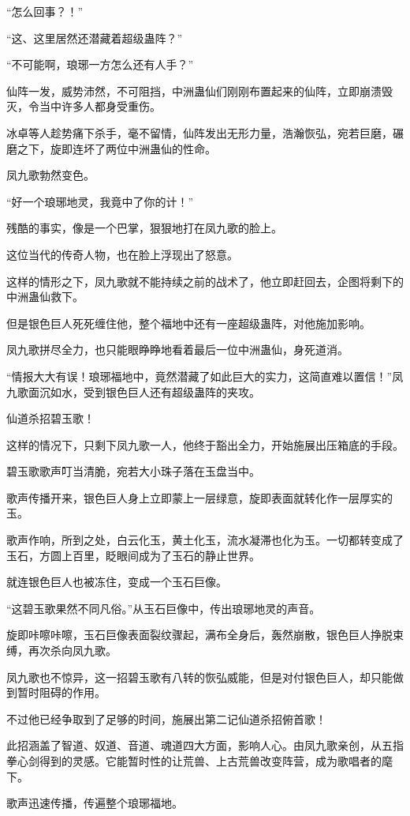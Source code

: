 \begin{this_body}
“怎么回事？！”

“这、这里居然还潜藏着超级蛊阵？”

“不可能啊，琅琊一方怎么还有人手？”

仙阵一发，威势沛然，不可阻挡，中洲蛊仙们刚刚布置起来的仙阵，立即崩溃毁灭，令当中许多人都身受重伤。

冰卓等人趁势痛下杀手，毫不留情，仙阵发出无形力量，浩瀚恢弘，宛若巨磨，碾磨之下，旋即连坏了两位中洲蛊仙的性命。

凤九歌勃然变色。

“好一个琅琊地灵，我竟中了你的计！”

残酷的事实，像是一个巴掌，狠狠地打在凤九歌的脸上。

这位当代的传奇人物，也在脸上浮现出了怒意。

这样的情形之下，凤九歌就不能持续之前的战术了，他立即赶回去，企图将剩下的中洲蛊仙救下。

但是银色巨人死死缠住他，整个福地中还有一座超级蛊阵，对他施加影响。

凤九歌拼尽全力，也只能眼睁睁地看着最后一位中洲蛊仙，身死道消。

“情报大大有误！琅琊福地中，竟然潜藏了如此巨大的实力，这简直难以置信！”凤九歌面沉如水，受到银色巨人还有超级蛊阵的夹攻。

仙道杀招碧玉歌！

这样的情况下，只剩下凤九歌一人，他终于豁出全力，开始施展出压箱底的手段。

碧玉歌歌声叮当清脆，宛若大小珠子落在玉盘当中。

歌声传播开来，银色巨人身上立即蒙上一层绿意，旋即表面就转化作一层厚实的玉。

歌声作响，所到之处，白云化玉，黄土化玉，流水凝滞也化为玉。一切都转变成了玉石，方圆上百里，眨眼间成为了玉石的静止世界。

就连银色巨人也被冻住，变成一个玉石巨像。

“这碧玉歌果然不同凡俗。”从玉石巨像中，传出琅琊地灵的声音。

旋即咔嚓咔嚓，玉石巨像表面裂纹骤起，满布全身后，轰然崩散，银色巨人挣脱束缚，再次杀向凤九歌。

凤九歌也不惊异，这一招碧玉歌有八转的恢弘威能，但是对付银色巨人，却只能做到暂时阻碍的作用。

不过他已经争取到了足够的时间，施展出第二记仙道杀招俯首歌！

此招涵盖了智道、奴道、音道、魂道四大方面，影响人心。由凤九歌亲创，从五指拳心剑得到的灵感。它能暂时性的让荒兽、上古荒兽改变阵营，成为歌唱者的麾下。

歌声迅速传播，传遍整个琅琊福地。


\end{this_body}
